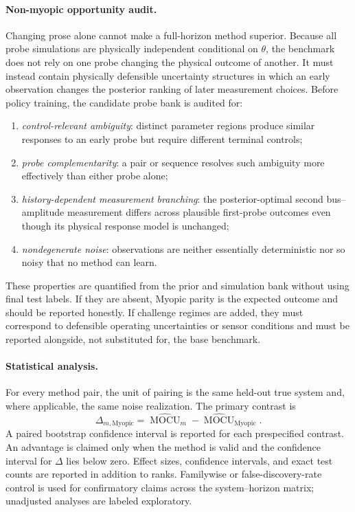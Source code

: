\documentclass[11pt]{article}
\begin{document}
\paragraph{Non-myopic opportunity audit.}
Changing prose alone cannot make a full-horizon method superior. Because all
probe simulations are physically independent conditional on \(\theta\), the
benchmark does not rely on one probe changing the physical outcome of another.
It must instead contain physically defensible uncertainty structures in which
an early observation changes the posterior ranking of later measurement
choices. Before policy training, the candidate
probe bank is audited for:
\begin{enumerate}
    \item \emph{control-relevant ambiguity}: distinct parameter regions
    produce similar responses to an early probe but require different
    terminal controls;
    \item \emph{probe complementarity}: a pair or sequence resolves such
    ambiguity more effectively than either probe alone;
    \item \emph{history-dependent measurement branching}: the
    posterior-optimal second bus--amplitude measurement differs across
    plausible first-probe outcomes even though its physical response model is
    unchanged;
    \item \emph{nondegenerate noise}: observations are neither essentially
    deterministic nor so noisy that no method can learn.
\end{enumerate}
These properties are quantified from the prior and simulation bank without
using final test labels. If they are absent, Myopic parity is the expected
outcome and should be reported honestly. If challenge regimes are added, they
must correspond to defensible operating uncertainties or sensor conditions
and must be reported alongside, not substituted for, the base benchmark.

\paragraph{Statistical analysis.}
For every method pair, the unit of pairing is the same held-out true system
and, where applicable, the same noise realization. The primary contrast is
\[
\Delta_{m,\mathrm{Myopic}}
=
\widehat{\operatorname{MOCU}}_m
-
\widehat{\operatorname{MOCU}}_{\mathrm{Myopic}}.
\]
A paired bootstrap confidence interval is reported for each prespecified
contrast. An advantage is claimed only when the method is valid and the
confidence interval for \(\Delta\) lies below zero. Effect sizes, confidence
intervals, and exact test counts are reported in addition to ranks. Familywise
or false-discovery-rate control is used for confirmatory claims across the
system--horizon matrix; unadjusted analyses are labeled exploratory.
\end{document}
